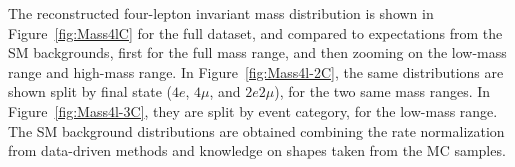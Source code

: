 {The reconstructed four-lepton invariant mass distribution is shown in Figure~\ref{fig:Mass4lC} for the full dataset, and compared to expectations from the SM backgrounds, first for the full mass range, and then zooming on the low-mass range and high-mass range. 
In Figure~\ref{fig:Mass4l-2C}, the same distributions are shown split by final state ($4e$, $4\mu$, and $2e2\mu$), for the two same mass ranges.
In Figure~\ref{fig:Mass4l-3C}, they are split by event category, for the low-mass range.
The SM background distributions are obtained combining the rate normalization from data-driven methods and knowledge on shapes taken from the MC samples. \\

}
